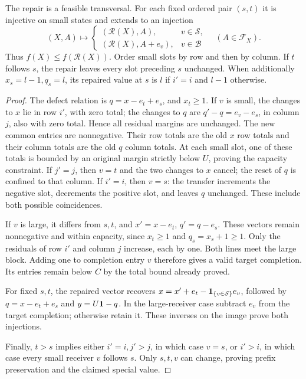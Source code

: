 \begin{lemma}\label{lem:repair}
The repair is a feasible transversal.  For each fixed ordered pair
$(s,t)$ it is injective on small states and extends to an injection
\[
 (X,A)\longmapsto
 \begin{cases}
 (\mathcal R(X),A),&v\in\mathcal S,\\
 (\mathcal R(X),A+e_v),&v\in\mathcal B
 \end{cases}
 \quad(A\in\mathcal F_X).
\]
Thus $f(X)\le f(\mathcal R(X))$.
Order small slots by row and then by column.  If $t$ follows $s$, the
repair leaves every slot preceding $s$ unchanged.  When additionally
$x_s=l-1,q_s=l$, its repaired value at $s$ is $l$ if $i'=i$ and $l-1$
otherwise.
\end{lemma}
\begin{proof}
The defect relation is $q=x-e_t+e_s$, and $x_t\ge1$.
If $v$ is small, the changes to $x$ lie in row $i'$, with zero total;
the changes to $q$ are $q'-q=e_v-e_s$, in column $j$, also with zero
total.  Hence all residual margins are unchanged.
The new common entries are nonnegative.  Their row totals are the old
$x$ row totals and their column totals are the old $q$ column totals.
At each small slot, one of these totals is bounded by an original
margin strictly below $U$, proving the capacity constraint.
If $j'=j$, then $v=t$ and the two changes to $x$ cancel; the reset of
$q$ is confined to that column.  If $i'=i$, then $v=s$: the transfer
increments the negative slot, decrements the positive slot, and leaves
$q$ unchanged.  These include both possible coincidences.

If $v$ is large, it differs from $s,t$, and
$x'=x-e_t$, $q'=q-e_s$.  These vectors remain nonnegative and within
capacity, since $x_t\ge1$ and $q_s=x_s+1\ge1$.
Only the residuals of row $i'$ and column $j$ increase, each by one.
Both lines meet the large block.  Adding one to completion entry $v$
therefore gives a valid target completion.  Its entries remain below
$C$ by the total bound already proved.

For fixed $s,t$, the repaired vector recovers
$x=x'+e_t-\mathbf{1}_{\{v\in\mathcal S\}}e_v$, followed by
$q=x-e_t+e_s$ and $y=U\mathbf{1}-q$.  In the large-receiver case subtract
$e_v$ from the target completion; otherwise retain it.  These inverses
on the image prove both injections.

Finally, $t>s$ implies either $i'=i,j'>j$, in which case $v=s$, or
$i'>i$, in which case every small receiver $v$ follows $s$.
Only $s,t,v$ can change, proving prefix preservation and the claimed
special value.
\end{proof}

